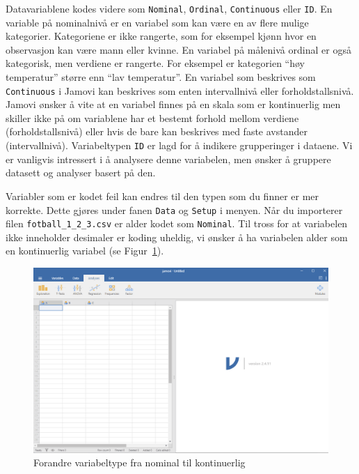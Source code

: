 \documentclass[
  letterpaper,
  DIV=11,
  numbers=noendperiod,
  oneside]{scrreprt}
\begin{document}
Datavariablene kodes videre som \texttt{Nominal}, \texttt{Ordinal},
\texttt{Continuous} eller \texttt{ID}. En variable på nominalnivå er en
variabel som kan være en av flere mulige kategorier. Kategoriene er ikke
rangerte, som for eksempel kjønn hvor en observasjon kan være mann eller
kvinne. En variabel på målenivå ordinal er også kategorisk, men verdiene
er rangerte. For eksempel er kategorien ``høy temperatur'' større enn
``lav temperatur''. En variabel som beskrives som \texttt{Continuous} i
Jamovi kan beskrives som enten intervallnivå eller forholdstallsnivå.
Jamovi ønsker å vite at en variabel finnes på en skala som er
kontinuerlig men skiller ikke på om variablene har et bestemt forhold
mellom verdiene (forholdstallsnivå) eller hvis de bare kan beskrives med
faste avstander (intervallnivå). Variabeltypen \texttt{ID} er lagd for å
indikere grupperinger i dataene. Vi er vanligvis intressert i å
analysere denne variabelen, men ønsker å gruppere datasett og analyser
basert på den.

Variabler som er kodet feil kan endres til den typen som du finner er
mer korrekte. Dette gjøres under fanen \texttt{Data} og \texttt{Setup} i
menyen. Når du importerer filen \texttt{fotball\_1\_2\_3.csv} er alder
kodet som \texttt{Nominal}. Til tross for at variabelen ikke inneholder
desimaler er koding uheldig, vi ønsker å ha variabelen alder som en
kontinuerlig variabel (se Figur~\ref{fig-changevariable}).

\begin{figure}

{\centering \includegraphics{img/01-jamovi/change-variable.gif}

}

\caption{\label{fig-changevariable}Forandre variabeltype fra nominal til
kontinuerlig}

\end{figure}
\end{document}
